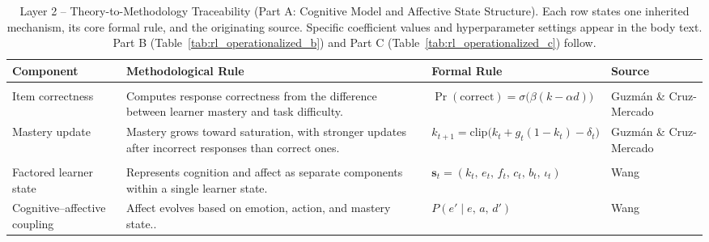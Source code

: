 \renewcommand{\arraystretch}{1.7}
\begin{table}[H]
\centering
\small
\caption{Layer 2 -- Theory-to-Methodology Traceability (Part A: Cognitive Model and Affective State Structure). Each row states one inherited mechanism, its core formal rule, and the originating source. Specific coefficient values and hyperparameter settings appear in the body text. Part B (Table~\ref{tab:rl_operationalized_b}) and Part C (Table~\ref{tab:rl_operationalized_c}) follow.}
\label{tab:rl_operationalized}
\begin{tabular}{>{\raggedright\arraybackslash}p{2.4cm}
                >{\raggedright\arraybackslash}p{5.0cm}
                >{\raggedright\arraybackslash}p{4.0cm}
                >{\raggedright\arraybackslash}p{2.2cm}}
\toprule
\textbf{Component} & \textbf{Methodological Rule} & \textbf{Formal Rule} & \textbf{Source} \\
\midrule
\multicolumn{4}{@{\hspace{0.3em}}l}{\small\bfseries Cognitive Model} \\
\midrule

Item correctness
    & Computes response correctness from the difference between learner mastery and task difficulty.
    & $\Pr(\text{correct}) = \sigma\!\bigl(\beta(k - \alpha d)\bigr)$
    & Guzm{\'a}n \& Cruz-Mercado \cite{guzman_developing_2025} \\[0.4em]

Mastery update
    & Mastery grows toward saturation, with stronger updates after incorrect responses than correct ones.
    & $k_{t+1} = \mathrm{clip}\!\bigl(k_t + g_t(1{-}k_t) - \delta_t\bigr)$
    & Guzm{\'a}n \& Cruz-Mercado \cite{guzman_developing_2025} \\

\midrule
\multicolumn{4}{@{\hspace{0.3em}}l}{\small\bfseries Affective State Structure} \\
\midrule

Factored learner state
    & Represents cognition and affect as separate components within a single learner state.
    & $\mathbf{s}_t = (k_t,\, e_t,\, f_t,\, c_t,\, b_t,\, \iota_t)$
    & Wang \cite{wang_factored_pomdp_2018} \\[0.4em]

Cognitive--affective coupling
    & Affect evolves based on emotion, action, and mastery state..
    & $P(e' \mid e,\, a,\, d')$
    & Wang \cite{wang_factored_pomdp_2018} \\

\bottomrule
\end{tabular}
\end{table}

